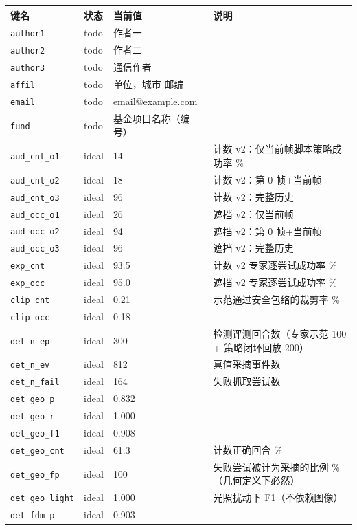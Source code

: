 \begin{longtable}{p{3.2cm}p{0.9cm}p{4.2cm}p{6.2cm}}
\toprule
键名 & 状态 & 当前值 & 说明\\
\midrule
\endhead
\texttt{author1} & todo & 作者一 & \\
\texttt{author2} & todo & 作者二 & \\
\texttt{author3} & todo & 通信作者 & \\
\texttt{affil} & todo & 单位，城市 邮编 & \\
\texttt{email} & todo & email@example.com & \\
\texttt{fund} & todo & 基金项目名称（编号） & \\
\texttt{aud\_cnt\_o1} & ideal & 14 & 计数 v2：仅当前帧脚本策略成功率 \%\\
\texttt{aud\_cnt\_o2} & ideal & 18 & 计数 v2：第 0 帧+当前帧\\
\texttt{aud\_cnt\_o3} & ideal & 96 & 计数 v2：完整历史\\
\texttt{aud\_occ\_o1} & ideal & 26 & 遮挡 v2：仅当前帧\\
\texttt{aud\_occ\_o2} & ideal & 94 & 遮挡 v2：第 0 帧+当前帧\\
\texttt{aud\_occ\_o3} & ideal & 96 & 遮挡 v2：完整历史\\
\texttt{exp\_cnt} & ideal & 93.5 & 计数 v2 专家逐尝试成功率 \%\\
\texttt{exp\_occ} & ideal & 95.0 & 遮挡 v2 专家逐尝试成功率 \%\\
\texttt{clip\_cnt} & ideal & 0.21 & 示范通过安全包络的裁剪率 \%\\
\texttt{clip\_occ} & ideal & 0.18 & \\
\texttt{det\_n\_ep} & ideal & 300 & 检测评测回合数（专家示范 100 + 策略闭环回放 200）\\
\texttt{det\_n\_ev} & ideal & 812 & 真值采摘事件数\\
\texttt{det\_n\_fail} & ideal & 164 & 失败抓取尝试数\\
\texttt{det\_geo\_p} & ideal & 0.832 & \\
\texttt{det\_geo\_r} & ideal & 1.000 & \\
\texttt{det\_geo\_f1} & ideal & 0.908 & \\
\texttt{det\_geo\_cnt} & ideal & 61.3 & 计数正确回合 \%\\
\texttt{det\_geo\_fp} & ideal & 100 & 失败尝试被计为采摘的比例 \%（几何定义下必然）\\
\texttt{det\_geo\_light} & ideal & 1.000 & 光照扰动下 F1（不依赖图像）\\
\texttt{det\_fdm\_p} & ideal & 0.903 & \\

\end{longtable}
